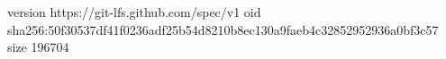 version https://git-lfs.github.com/spec/v1
oid sha256:50f30537df41f0236adf25b54d8210b8ec130a9faeb4c32852952936a0bf3c57
size 196704
